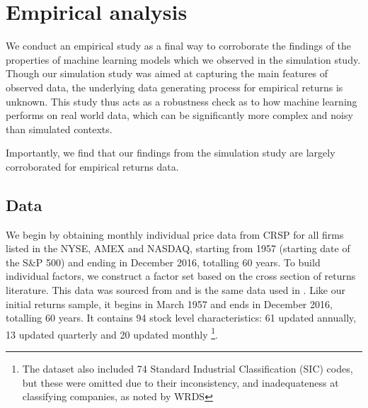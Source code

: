 \documentclass{article}
\begin{document}

\section{Empirical analysis}
We conduct an empirical study as a final way to corroborate the findings of the properties of machine learning models which we observed in the simulation study. Though our simulation study was aimed at capturing the main features of observed data, the underlying data generating process for empirical returns is unknown. This study thus acts as a robustness check as to how machine learning performs on real world data, which can be significantly more complex and noisy than simulated contexts. 

Importantly, we find that our findings from the simulation study are largely corroborated for empirical returns data.

\subsection{Data}
We begin by obtaining monthly individual price data from CRSP for all firms listed in the NYSE, AMEX and NASDAQ, starting from 1957 (starting date of the S\&P 500) and ending in December 2016, totalling 60 years. To build individual factors, we construct a factor set based on the cross section of returns literature. This data was sourced from and is the same data used in \cite{gu_empirical_2018}. Like our initial returns sample, it begins in March 1957 and ends in December 2016, totalling 60 years. It contains 94 stock level characteristics: 61 updated annually, 13 updated quarterly and 20 updated monthly \footnote{The dataset also included 74 Standard Industrial Classification (SIC) codes, but these were omitted due to their inconsistency, and inadequateness at classifying companies, as noted by WRDS}.
\end{document}
